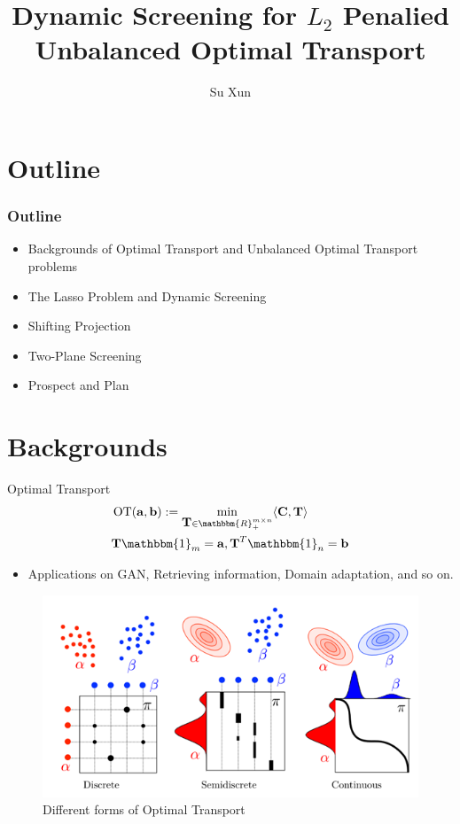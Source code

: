 \documentclass[dvipdfmx,cjk,t,10pt]{beamer}
\newcommand{\R}{\mathbbm{R}}
\newcommand{\one}{\mathbbm{1}}
\renewcommand{\vec}[1]{\mathbf{#1}}
\begin{document}
\title{Dynamic Screening for $L_2$ Penalied Unbalanced Optimal Transport}
\author[shortname]{Su Xun}

\begin{frame}
\titlepage
	
	\vspace*{-0.5cm}
\end{frame}

\section{Outline}
\begin{frame}
\frametitle{Outline}

	\begin{itemize}
	\item Backgrounds of Optimal Transport and Unbalanced Optimal Transport problems
	\itemspace	
	\item The Lasso Problem and Dynamic Screening
	\itemspace	
	\item Shifting Projection
	\itemspace
	\item Two-Plane Screening 
	\itemspace	
	\item Prospect and Plan
	\itemspace
	\end{itemize}		
\end{frame}


\section{Backgrounds}
\begin{frame}
	\begin{screen}{Optimal Transport}
\begin{equation}
\begin{split}
&\operatorname{OT}(\vec{a},\vec{b}) := \min_{ \mat{T} \in \R_{+}^{m \times n}} \langle \mat{C}, \mat{T} \rangle \\
& \mat{T} \one_m= \vec{a}, \mat{T}^{T}\one_n = \vec{b}
\end{split}
\end{equation}
\end{screen}	
	\begin{itemize}
	\item Applications on GAN, Retrieving information, Domain adaptation, and so on.
	\end{itemize}	
	\begin{figure}[htbp]
	\begin{center}	
	\includegraphics[width=0.5\hsize]{pic/ot}
	\caption{Different forms of Optimal Transport}
	\end{center}	
	\end{figure}			
	
\end{frame}
\end{document}
